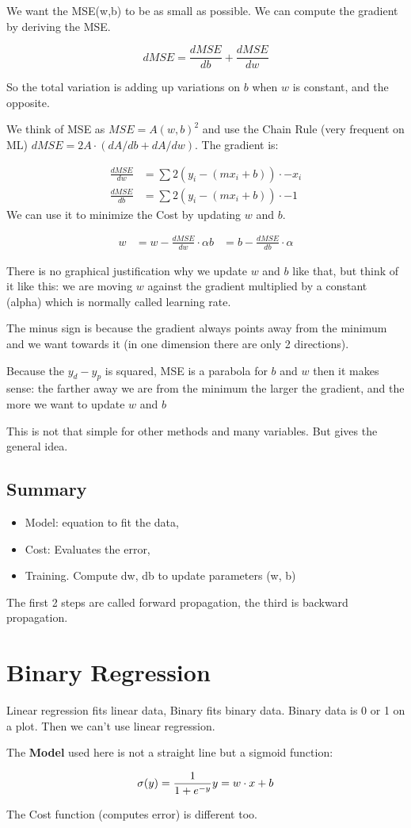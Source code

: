 \documentclass{article}
\begin{document}
We want the MSE(w,b) to be as small as possible. We can compute the gradient by deriving the MSE.

$$dMSE = \frac{dMSE}{db} + \frac{dMSE}{dw}$$

So the total variation is adding up variations on $b$ when $w$ is constant, and the opposite. 

We think of MSE as $MSE = A(w,b)^2$ and use the Chain Rule (very frequent on ML) $dMSE = 2A\cdot(dA/db + dA/dw)$. The gradient is:

\begin{align}
\frac{dMSE}{dw} &= \sum 2(y_i - (mx_i + b)) \cdot -x_i\\
\frac{dMSE}{db} &= \sum 2(y_i - (mx_i + b)) \cdot -1
\end{align}
We can use it to minimize the Cost by updating $w$ and $b$. 

\begin{align}
 w & =  w - \frac{dMSE}{dw}\cdot\alpha
 b & =  b - \frac{dMSE}{db}\cdot\alpha
\end{align}

There is no graphical justification why we update $w$ and $b$ like that, but think of it like this: we are moving $w$ against the gradient multiplied by a constant (alpha) which is normally called learning rate.

The minus sign is because the gradient always points away from the minimum and we want towards it (in one dimension there are only 2 directions). 

Because the $y_d - y_p$ is squared, MSE is a parabola for $b$ and $w$ then it makes sense: the farther away we are from the minimum the larger the gradient, and the more we want to update $w$ and $b$

This is not that simple for other methods and many variables. But gives the general idea.


\subsection{Summary}
\begin{itemize}
  \item Model: equation to fit the data,
  \item Cost: Evaluates the error,
  \item Training. Compute dw, db to update parameters (w, b)
\end{itemize}

The first 2 steps are called forward propagation, the third is backward propagation.


\section{Binary Regression}
Linear regression fits linear data, Binary fits binary data. Binary data is 0 or 1 on a plot. Then we can't use linear regression. 

The \textbf{Model} used here is not a straight line but a sigmoid function:

$$
\sigma(y) =  \frac{1}{1+e^{-y}}\\
y =  w\cdot{}x + b
$$

The Cost function (computes error) is different too.
\end{document}
